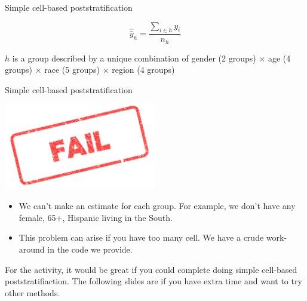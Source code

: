 \documentclass[aspectratio=169]{beamer}
\begin{document}
\begin{frame}{Simple cell-based poststratification}

\begin{equation*}
\hat{\bar{y}}_h = \frac{\sum_{i \in h} y_i}{n_h}
\end{equation*}

\vfill
$h$ is a group described by a unique combination of gender (2 groups) $\times$ age (4 groups) $\times$ race (5 groups) $\times$ region (4 groups) 

\end{frame}
\begin{frame}{Simple cell-based poststratification}

\begin{center}
\includegraphics[width=0.5\textwidth]{figures/fail}
\end{center}

\vfill

\begin{itemize}
\item We can't make an estimate for each group.  For example, we don't have any female, 65+, Hispanic living in the South. \pause
\item This problem can arise if you have too many cell.  We have a crude work-around in the code we provide. 
\end{itemize}

\end{frame}
\begin{frame}

For the activity, it would be great if you could complete doing simple cell-based poststratifiaction.  The following slides are if you have extra time and want to try other methods.

\end{frame}
\end{document}
